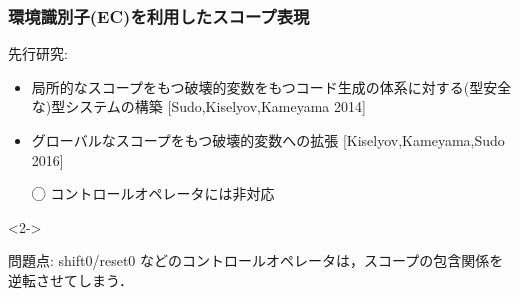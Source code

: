 






\begin{frame}
  \frametitle{環境識別子(EC)を利用したスコープ表現}

  先行研究:
  \begin{itemize}
  \item 局所的なスコープをもつ破壊的変数をもつコード生成の体系に対する(型安全な)型システムの構築
    [Sudo,Kiselyov,Kameyama 2014]
  \item グローバルなスコープをもつ破壊的変数への拡張
    [Kiselyov,Kameyama,Sudo 2016]
  \item[◯] コントロールオペレータには非対応
  \end{itemize}

  \medskip
  \begin{uncoverenv}<2->
    \begin{exampleblock}{問題点:}
      shift0/reset0 などのコントロールオペレータは，スコープの包含関係を逆転させてしまう．
    \end{exampleblock}
  \end{uncoverenv}
\end{frame}


